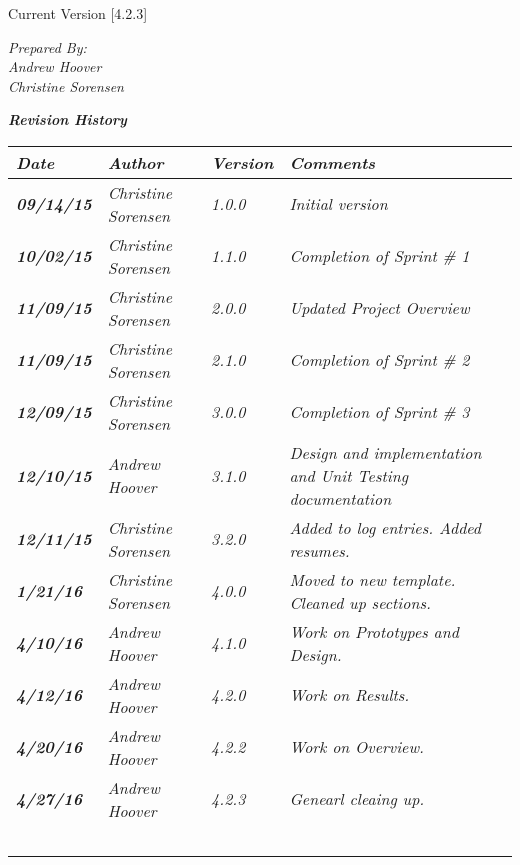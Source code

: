 


Current Version [4.2.3]
\vspace*{5mm}

{\color{SDColor5}
\noindent
\textit{Prepared By:}\\
\textit{Andrew Hoover}\\
\textit{Christine Sorensen}
}

\vfill
\noindent
{\color{SDColor3} \textit{\textbf{Revision History}}}\\
\begin{tabular}{|>{\raggedright}p{1.5cm}|>{\raggedright}p{3cm}|>{\raggedright}p{1.5cm}|>{\raggedright}p{9cm}|}
\hline
\textit{\textbf{Date}} &  \textit{\textbf{Author}} & \textit{\textbf{Version}} & \textit{\textbf{Comments}}\tabularnewline
\hline

\textit{\textbf{09/14/15}} & \textit{Christine Sorensen} & \textit{1.0.0} & \textit{Initial version}\tabularnewline
\hline
\textit{\textbf{10/02/15}} & \textit{Christine Sorensen} & \textit{1.1.0} & \textit{Completion of Sprint \# 1}\tabularnewline
\hline
\textit{\textbf{11/09/15}} & \textit{Christine Sorensen} & \textit{2.0.0} & \textit{Updated Project Overview}\tabularnewline
\hline
\textit{\textbf{11/09/15}} & \textit{Christine Sorensen} & \textit{2.1.0} & \textit{Completion of Sprint \# 2}\tabularnewline
\hline
\textit{\textbf{12/09/15}} & \textit{Christine Sorensen} & \textit{3.0.0} & \textit{Completion of Sprint \# 3}\tabularnewline
\hline
\textit{\textbf{12/10/15}} & \textit{Andrew Hoover} & \textit{3.1.0} & \textit{Design and implementation and Unit Testing documentation}\tabularnewline
\hline
\textit{\textbf{12/11/15}} & \textit{Christine Sorensen} & \textit{3.2.0} & \textit{Added to log entries. Added resumes.}\tabularnewline
\hline
\textit{\textbf{1/21/16}} & \textit{Christine Sorensen} & \textit{4.0.0} & \textit{Moved to new template. Cleaned up sections.}\tabularnewline
\hline
\textit{\textbf{4/10/16}} & \textit{Andrew Hoover} & \textit{4.1.0} & \textit{Work on Prototypes and Design.}\tabularnewline
\hline
\textit{\textbf{4/12/16}} & \textit{Andrew Hoover} & \textit{4.2.0} & \textit{Work on Results.}\tabularnewline
\hline
\textit{\textbf{4/20/16}} & \textit{Andrew Hoover} & \textit{4.2.2} & \textit{Work on Overview.}\tabularnewline
\hline
\textit{\textbf{4/27/16}} & \textit{Andrew Hoover} & \textit{4.2.3} & \textit{Genearl cleaing up.}\tabularnewline



\hline
 &  &  & \tabularnewline
 \hline
 &  &  & \tabularnewline
\hline
 &  &  & \tabularnewline
\hline
 &  &  & \tabularnewline
\hline
 &  &  & \tabularnewline
\hline
\end{tabular}
\vfill

